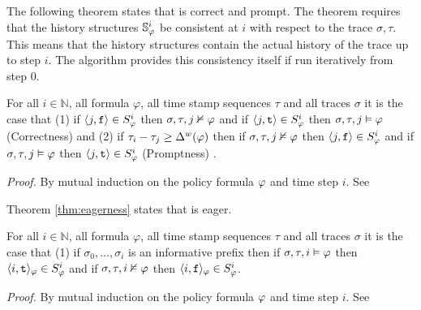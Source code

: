 The following theorem states that \monitor is correct and prompt. The theorem requires that the history structures $\mathbb{S}^{i}_{\varphi}$ be consistent at $i$ with respect to the trace $\sigma,\tau$. This means that the history structures contain the actual history of the trace up to step $i$. The algorithm provides this consistency itself if run iteratively from step $0$.

\begin{theorem}
For all $i \in \mathbb{N}$, all formula $\varphi$, all time stamp sequences $\tau$ and all traces $\sigma$ it is the case that (1) if $\langle j, \mathrm{\texttt{f}} \rangle \in {S}^{i}_{\varphi}$ then $\sigma, \tau, j \nvDash \varphi$ and if $\langle j, \mathrm{\texttt{t}} \rangle \in {S}^{i}_{\varphi}$ then $\sigma, \tau, j \vDash \varphi$ (Correctness) and (2) if $\tau_i - \tau_j \geq \Delta^w(\varphi)$ then if $\sigma, \tau, j \nvDash \varphi$ then $\langle j, \mathrm{\texttt{f}} \rangle \in {S}^{i}_{\varphi}$ and if $\sigma, \tau, j \vDash \varphi$ then $\langle j, \mathrm{\texttt{t}} \rangle \in {S}^{i}_{\varphi}$ (Promptness)
.
\end{theorem}
\textit{Proof.} By mutual induction on the policy formula $\varphi$ and time step $i$. See \cite{TechPaper}

Theorem \ref{thm:eagerness} states that \monitor is eager. 

\begin{theorem}
For all $i \in \mathbb{N}$, all formula $\varphi$, all time stamp sequences $\tau$ and all traces $\sigma$ it is the case that (1) if $\sigma_0,\ldots,\sigma_i$ is an informative prefix then if $\sigma,\tau, i \vDash \varphi$ then $\langle i, \mathrm{\texttt{t}} \rangle_{\varphi} \in {S}^{i}_{\varphi}$ and if $\sigma, \tau, i \nvDash \varphi$ then $\langle i, \mathrm{\texttt{f}} \rangle_{\varphi} \in {S}^{i}_{\varphi}$. 
\end{theorem}
\textit{Proof.} By mutual induction on the policy formula $\varphi$ and time step $i$. See \cite{TechPaper}
